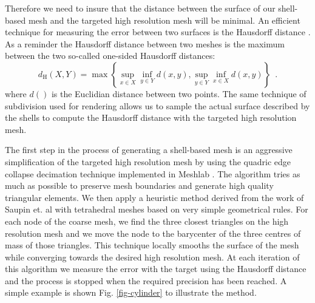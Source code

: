 \documentclass{llncs}
\begin{document}
Therefore we need to insure that the distance between the surface of our shell-based mesh and the targeted high resolution mesh will be minimal. An efficient technique for measuring the error between two surfaces is the Hausdorff distance \cite{Klein96,Cignoni98}. As a reminder the Hausdorff distance between two meshes is the maximum between the two so-called one-sided Hausdorff distances:
\begin{equation}
d_{\mathrm{H}}(X,Y) = \max \left\{ \sup_{x \in X} \inf_{y \in Y} d(x,y), \sup_{y \in Y} \inf_{x \in X} d(x,y) \right\} \enspace .
\end{equation}
where $d()$ is the Euclidian distance between two points. The same technique of subdivision used for rendering allows us to sample the actual surface described by the shells to compute the Hausdorff distance with the targeted high resolution mesh. 

The first step in the process of generating a shell-based mesh is an aggressive simplification of the targeted high resolution mesh by using the quadric edge collapse decimation technique implemented in Meshlab \cite{Meshlab}. The algorithm tries as much as possible to preserve mesh boundaries and generate high quality triangular elements. We then apply a heuristic method derived from the work of Saupin et. al \cite{Saupin07} with tetrahedral meshes based on very simple geometrical rules. For each node of the coarse mesh, we find the three closest triangles on the high resolution mesh and we move the node to the barycenter of the three centres of mass of those triangles. This technique locally smooths the surface of the mesh while converging towards the desired high resolution mesh. At each iteration of this algorithm we measure the error with the target using the Hausdorff distance and the process is stopped when the required precision has been reached. A simple example is shown Fig. \ref{fig-cylinder} 
to illustrate the method. 
\end{document}
